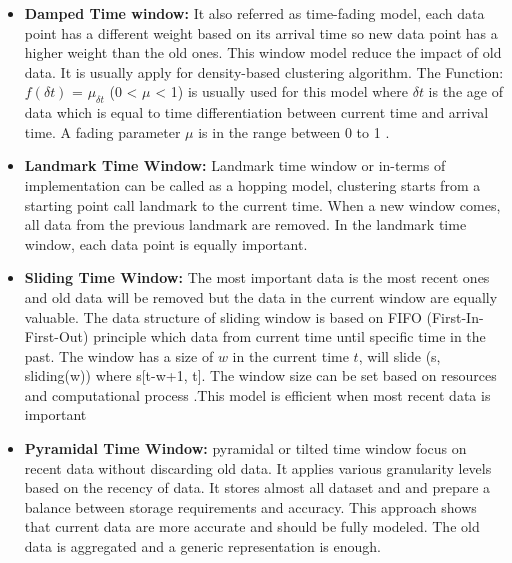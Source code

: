 \documentclass[../UNBThesis2.tex]{subfiles}
\begin{document}
\begin{itemize}

    \item\textbf{Damped Time window:} It also referred as time-fading model, each data point has a different weight based on its arrival time so new data point has a higher weight than the old ones. This window model reduce the impact of old data. It is usually apply for density-based clustering algorithm. The Function: $f(\delta t)$ = $\mu_{\delta t}$ (0 < $\mu$ < 1) is usually used for this model where $\delta t$ is the age of data which is equal to time differentiation between current time and arrival time. A fading parameter $\mu$ is in the range between 0 to 1 \cite{nguyen2015survey}. 
    
    
    \item\textbf{Landmark Time Window:} Landmark time window or in-terms of implementation can be called as a hopping model, clustering starts from a starting point call landmark to the current time. When a new window comes, all data from the previous landmark are removed. In the landmark time window, each data point is equally important.


    
    \item\textbf{Sliding Time Window: } The most important data is the most recent ones and old data will be removed but the data in the current window are equally valuable. The data structure of sliding window is based on FIFO (First-In-First-Out) principle which data from current time until specific time in the past. The window has a size of $w$ in the current time $t$, will slide (s, sliding(w)) where s[t-w+1, t].
    The window size can be set based on resources and computational process \cite{silva2013data}.This model is efficient when most recent data is important \cite{mansalis2018evaluation}  
    
    \item\textbf{Pyramidal Time Window: } pyramidal or tilted time window focus on recent data without discarding old data. It applies various granularity levels based on the recency of data\cite{aggarwal2003framework, nguyen2015survey}. It stores almost all dataset and and prepare a balance between storage requirements and accuracy. This approach shows that current data are more accurate and should be fully modeled. The old data is aggregated and a generic representation is enough.
    
\end{itemize}    
\end{document}
